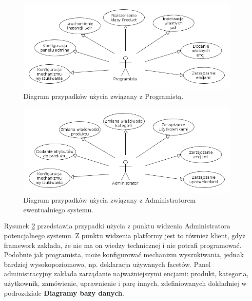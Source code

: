 \begin{figure}
\begin{center}
	\includegraphics[width=1\textwidth]{ucdev.png}
\end{center}
\caption{{\color{black}Diagram przypadków użycia związany z Programistą.}} \label{useCaseProgrammer}
\end{figure}
\begin{figure}
	\begin{center}
		\includegraphics[width=1\textwidth]{ucadmin.png}
	\end{center}
	\caption{{\color{black}Diagram przypadków użycia związany z Administratorem ewentualniego systemu.}} \label{useCaseAdmin}
\end{figure}
Rysunek \ref{useCaseAdmin} przedstawia przypadki użycia z punktu widzenia Administratora potencjalnego systemu. Z punktu widzenia platformy jest to również klient, gdyż framework zakłada, że nie ma on wiedzy technicznej i nie potrafi programować. Podobnie jak programista, może konfigurować mechanizm wyszukiwania, jednak bardziej wysokopoziomowo, np. deklaracja używanych facetów. Panel administracyjny zakłada zarządanie najważniejszymi encjami: produkt, kategoria, użytkownik, zamówienie, uprawnienie i parę innych, zdefiniowanych dokładniej w podrozdziale \textbf{Diagramy bazy danych}.

